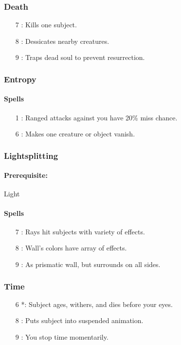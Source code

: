 \subsubsection{Death}
\begin{itemize}
 \item[7] : Kills one subject.
 \item[8] : Dessicates nearby creatures.
 \item[9] : Traps dead soul to prevent resurrection.
\end{itemize}

\subsubsection{Entropy}
\paragraph{Spells}
\begin{itemize}
 \item[1] : Ranged attacks against you have 20\% miss chance.
 \item[6] : Makes one creature or object vanish.
\end{itemize}

\subsubsection{Lightsplitting}
\paragraph{Prerequisite:} Light
\paragraph{Spells}
\begin{itemize}
 \item[7] : Rays hit subjects with variety of effects.
 \item[8] : Wall's colors have array of effects.
 \item[9] : As prismatic wall, but surrounds on all sides.
\end{itemize}

\subsubsection{Time}
\begin{itemize}
 \item[6] *: Subject ages, withers, and dies before your eyes.
 \item[8] : Puts subject into suspended animation.
 \item[9] : You stop time momentarily.
\end{itemize}